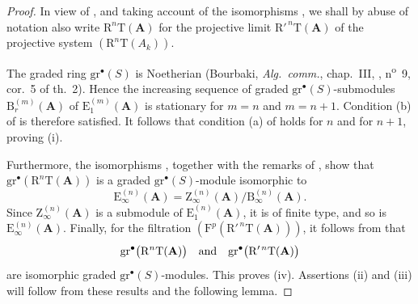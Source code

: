 \documentclass[oneside]{amsart}
\theoremstyle{ega-env-style}
\theoremstyle{ega-thm-env-style}
\theoremstyle{ega-defn-env-style}
\def\bb{\mathbf}                    %
\def\RR{\mathrm{R}}                 %
\begin{document}
\begin{proof}
In view of , and taking account of the
isomorphisms , we shall by abuse of notation also
write $\RR^n\mathrm{T}(\bb{A})$ for the projective limit
$\RR'^{\,n}\mathrm{T}(\bb{A})$ of the projective system
$(\RR^n\mathrm{T}(A_k))$.

The graded ring $\mathrm{gr}^\bullet(S)$ is Noetherian
(Bourbaki, \emph{Alg.\ comm.}, chap.~III, ,
n\textsuperscript{o}~9, cor.~5 of th.~2).
Hence the increasing sequence of graded
$\mathrm{gr}^\bullet(S)$-submodules
$\mathrm{B}_r^{(m)}(\bb{A})$ of
$\mathrm{E}_1^{(m)}(\bb{A})$ is stationary for $m=n$ and
$m=n+1$.
Condition {\rm(b)} of  is therefore satisfied.
It follows that condition {\rm(a)} of  holds for
$n$ and for $n+1$, proving {\rm(i)}.

Furthermore, the isomorphisms , together with the
remarks of , show that
$\mathrm{gr}^\bullet(\RR^n\mathrm{T}(\bb{A}))$ is a graded
$\mathrm{gr}^\bullet(S)$-module isomorphic to
\[
  \mathrm{E}_\infty^{(n)}(\bb{A})
  =
  \mathrm{Z}_\infty^{(n)}(\bb{A})
  /
  \mathrm{B}_\infty^{(n)}(\bb{A}).
\]
Since $\mathrm{Z}_\infty^{(n)}(\bb{A})$ is a submodule of
$\mathrm{E}_1^{(n)}(\bb{A})$, it is of finite type, and so is
$\mathrm{E}_\infty^{(n)}(\bb{A})$.
Finally, for the filtration
$(\mathrm{F}^p(\RR'^{\,n}\mathrm{T}(\bb{A})))$, it follows from
 that
\[
  \mathrm{gr}^\bullet\bigl(\RR^n\mathrm{T}(\bb{A})\bigr)
  \quad\hbox{and}\quad
  \mathrm{gr}^\bullet\bigl(\RR'^{\,n}\mathrm{T}(\bb{A})\bigr)
\]
are isomorphic graded $\mathrm{gr}^\bullet(S)$-modules.
This proves {\rm(iv)}.
Assertions {\rm(ii)} and {\rm(iii)} will follow from these results
and the following lemma.
\end{proof}
\end{document}
